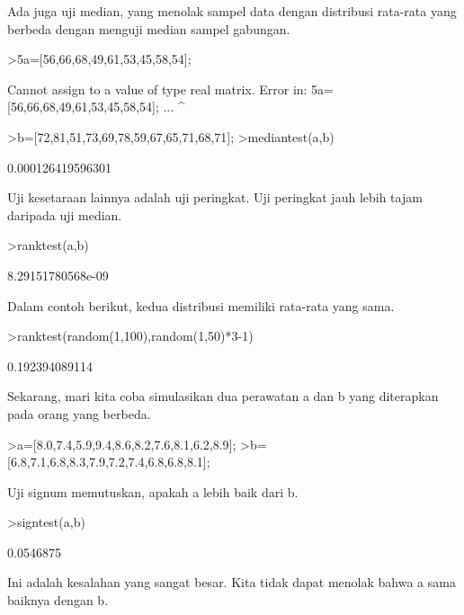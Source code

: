 \documentclass[a4paper,10pt]{article}
\begin{document}
\begin{eulernotebook}
\begin{eulercomment}
Ada juga uji median, yang menolak sampel data dengan distribusi
rata-rata yang berbeda dengan menguji median sampel gabungan.
\end{eulercomment}
\begin{eulerprompt}
>5a=[56,66,68,49,61,53,45,58,54];
\end{eulerprompt}
\begin{euleroutput}
  Cannot assign to a value of type real matrix.
  Error in:
  5a=[56,66,68,49,61,53,45,58,54]; ...
    ^
\end{euleroutput}
\begin{eulerprompt}
>b=[72,81,51,73,69,78,59,67,65,71,68,71];
>mediantest(a,b)
\end{eulerprompt}
\begin{euleroutput}
  0.000126419596301
\end{euleroutput}
\begin{eulercomment}
Uji kesetaraan lainnya adalah uji peringkat. Uji peringkat jauh lebih
tajam daripada uji median.
\end{eulercomment}
\begin{eulerprompt}
>ranktest(a,b)
\end{eulerprompt}
\begin{euleroutput}
  8.29151780568e-09
\end{euleroutput}
\begin{eulercomment}
Dalam contoh berikut, kedua distribusi memiliki rata-rata yang sama.
\end{eulercomment}
\begin{eulerprompt}
>ranktest(random(1,100),random(1,50)*3-1)
\end{eulerprompt}
\begin{euleroutput}
  0.192394089114
\end{euleroutput}
\begin{eulercomment}
Sekarang, mari kita coba simulasikan dua perawatan a dan b yang
diterapkan pada orang yang berbeda.
\end{eulercomment}
\begin{eulerprompt}
>a=[8.0,7.4,5.9,9.4,8.6,8.2,7.6,8.1,6.2,8.9];
>b=[6.8,7.1,6.8,8.3,7.9,7.2,7.4,6.8,6.8,8.1];
\end{eulerprompt}
\begin{eulercomment}
Uji signum memutuskan, apakah a lebih baik dari b.
\end{eulercomment}
\begin{eulerprompt}
>signtest(a,b)
\end{eulerprompt}
\begin{euleroutput}
  0.0546875
\end{euleroutput}
\begin{eulercomment}
Ini adalah kesalahan yang sangat besar. Kita tidak dapat menolak bahwa
a sama baiknya dengan b.


\end{eulercomment}
\end{eulernotebook}
\end{document}
